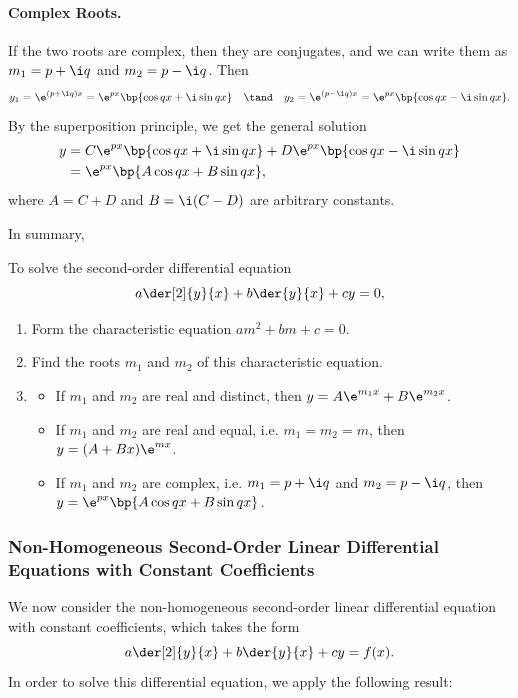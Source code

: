 \paragraph{Complex Roots.} If the two roots are complex, then they are conjugates, and we can write them as $m_1 = p + \i q$ and $m_2 = p - \i q$. Then \[y_1 = \e^{(p + \i q)x} = \e^{px} \bp{\cos qx + \i \sin qx} \quad \tand \quad y_2 = \e^{(p -\i q) x} = \e^{px} \bp{\cos qx - \i \sin qx}.\] By the superposition principle, we get the general solution
\begin{align*}
    y &= C\e^{px} \bp{\cos qx + \i \sin qx} + D\e^{px} \bp{\cos qx - \i \sin qx}\\
    &= \e^{px} \bp{A \cos qx + B \sin qx},
\end{align*}
where $A = C + D$ and $B = \i (C - D)$ are arbitrary constants.

In summary,
\begin{recipe}
    To solve the second-order differential equation \[a \der[2]{y}{x} + b \der{y}{x} + cy = 0,\]
    \begin{enumerate}
        \item Form the characteristic equation $am^2 + bm + c = 0$.
        \item Find the roots $m_1$ and $m_2$ of this characteristic equation.
        \item \begin{itemize}
            \item If $m_1$ and $m_2$ are real and distinct, then $y = A \e^{m_1 x} + B \e^{m_2 x}$.
            \item If $m_1$ and $m_2$ are real and equal, i.e. $m_1 = m_2 = m$, then $y = (A + Bx) \e^{m x}$.
            \item If $m_1$ and $m_2$ are complex, i.e. $m_1 = p + \i q$ and $m_2 = p - \i q$, then $y = \e^{px} \bp{A \cos qx + B \sin qx}$.
        \end{itemize}
    \end{enumerate}    
\end{recipe}

\subsubsection{Non-Homogeneous Second-Order Linear Differential Equations with Constant Coefficients}

We now consider the non-homogeneous second-order linear differential equation with constant coefficients, which takes the form \[a \der[2]{y}{x} + b \der{y}{x} + c y = f(x).\] In order to solve this differential equation, we apply the following result:


